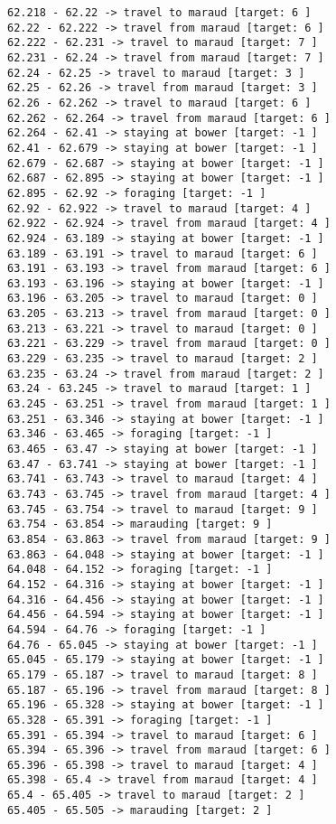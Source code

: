 \documentclass[11pt]{article}
\begin{document}
\begin{Verbatim}[commandchars=\\\{\}]
62.218 - 62.22 -> travel to maraud [target: 6 ]
62.22 - 62.222 -> travel from maraud [target: 6 ]
62.222 - 62.231 -> travel to maraud [target: 7 ]
62.231 - 62.24 -> travel from maraud [target: 7 ]
62.24 - 62.25 -> travel to maraud [target: 3 ]
62.25 - 62.26 -> travel from maraud [target: 3 ]
62.26 - 62.262 -> travel to maraud [target: 6 ]
62.262 - 62.264 -> travel from maraud [target: 6 ]
62.264 - 62.41 -> staying at bower [target: -1 ]
62.41 - 62.679 -> staying at bower [target: -1 ]
62.679 - 62.687 -> staying at bower [target: -1 ]
62.687 - 62.895 -> staying at bower [target: -1 ]
62.895 - 62.92 -> foraging [target: -1 ]
62.92 - 62.922 -> travel to maraud [target: 4 ]
62.922 - 62.924 -> travel from maraud [target: 4 ]
62.924 - 63.189 -> staying at bower [target: -1 ]
63.189 - 63.191 -> travel to maraud [target: 6 ]
63.191 - 63.193 -> travel from maraud [target: 6 ]
63.193 - 63.196 -> staying at bower [target: -1 ]
63.196 - 63.205 -> travel to maraud [target: 0 ]
63.205 - 63.213 -> travel from maraud [target: 0 ]
63.213 - 63.221 -> travel to maraud [target: 0 ]
63.221 - 63.229 -> travel from maraud [target: 0 ]
63.229 - 63.235 -> travel to maraud [target: 2 ]
63.235 - 63.24 -> travel from maraud [target: 2 ]
63.24 - 63.245 -> travel to maraud [target: 1 ]
63.245 - 63.251 -> travel from maraud [target: 1 ]
63.251 - 63.346 -> staying at bower [target: -1 ]
63.346 - 63.465 -> foraging [target: -1 ]
63.465 - 63.47 -> staying at bower [target: -1 ]
63.47 - 63.741 -> staying at bower [target: -1 ]
63.741 - 63.743 -> travel to maraud [target: 4 ]
63.743 - 63.745 -> travel from maraud [target: 4 ]
63.745 - 63.754 -> travel to maraud [target: 9 ]
63.754 - 63.854 -> marauding [target: 9 ]
63.854 - 63.863 -> travel from maraud [target: 9 ]
63.863 - 64.048 -> staying at bower [target: -1 ]
64.048 - 64.152 -> foraging [target: -1 ]
64.152 - 64.316 -> staying at bower [target: -1 ]
64.316 - 64.456 -> staying at bower [target: -1 ]
64.456 - 64.594 -> staying at bower [target: -1 ]
64.594 - 64.76 -> foraging [target: -1 ]
64.76 - 65.045 -> staying at bower [target: -1 ]
65.045 - 65.179 -> staying at bower [target: -1 ]
65.179 - 65.187 -> travel to maraud [target: 8 ]
65.187 - 65.196 -> travel from maraud [target: 8 ]
65.196 - 65.328 -> staying at bower [target: -1 ]
65.328 - 65.391 -> foraging [target: -1 ]
65.391 - 65.394 -> travel to maraud [target: 6 ]
65.394 - 65.396 -> travel from maraud [target: 6 ]
65.396 - 65.398 -> travel to maraud [target: 4 ]
65.398 - 65.4 -> travel from maraud [target: 4 ]
65.4 - 65.405 -> travel to maraud [target: 2 ]
65.405 - 65.505 -> marauding [target: 2 ]

\end{Verbatim}
\end{document}
